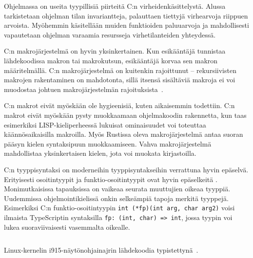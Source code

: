 Ohjelmassa on useita tyypillisiä piirteitä C:n virheidenkäsittelystä. Alussa
tarkistetaan ohjelman tilan invariantteja, palauttaen tiettyjä virhearvoja
riippuen arvoista. Myöhemmin käsitellään muiden funktioiden paluuarvoja ja
mahdollisesti vapautetaan ohjelman varaamia resursseja virhetilanteiden
yhteydessä.

C:n makrojärjestelmä on hyvin yksinkertainen. Kun esikääntäjä tunnistaa
lähdekoodissa makron tai makrokutsun, esikääntäjä korvaa sen makron
määritelmällä. C:n makrojärjestelmä on kuitenkin rajoittunut -- rekursiivisten
makrojen rakentaminen on mahdotonta, sillä itsensä sisältäviä makroja ei voi
muodostaa johtuen makrojärjestelmän rajoituksista~\citep[luku 6.10.3.4]{C18}.

C:n makrot eivät myöskään ole hygieenisiä, kuten aikaisemmin todettiin. C:n
makrot eivät myöskään pysty muokkaamaan ohjelmakoodin rakennetta, kun taas
esimerkiksi LISP-kieliperheessä lukuisat ominaisuudet voi toteuttaa
käännösaikaisilla makroilla. Myös Rustissa oleva makrojärjestelmä antaa suoran
pääsyn kielen syntaksipuun muokkaamiseen. Vahva makrojärjestelmä mahdollistaa
yksinkertaisen kielen, jota voi muokata kirjastoilla.

C:n tyyppisyntaksi on moderneihin tyyppisyntakseihin verrattuna hyvin epäselvä.
Erityisesti osoitintyypit ja funktio-osoitintyypit ovat hyvin epäselkeitä%
. Monimutkaisissa tapauksissa on vaikeaa seurata muuttujien oikeaa tyyppiä.
Uudemmissa ohjelmointikielissä onkin selkeämpiä tapoja merkitä tyyppejä.
Esimerkiksi C:n funktio-osoitintyypin \texttt{int~(*fp)(int~arg,~char~arg2)}
voisi ilmaista TypeScriptin syntaksilla \texttt{fp:~(int,~char)~=>~int}, jossa
tyypin voi lukea suoraviivaisesti vasemmalta oikealle.

\FloatBarrier

\begin{listing}[ht!]
    \inputminted{C}{c-error-handling.c}
    \caption{Linux-kernelin i915-näytönohjainajrin lähdekoodia
    typistettynä~\citep[\texttt{drivers/gpu/drm/i915/i915\_perf.c}, funktio
    \texttt{i915\_oa\_stream\_init}]{i915debugfs}.}
    \label{fig:cerrorhandling}
\end{listing}

\FloatBarrier


